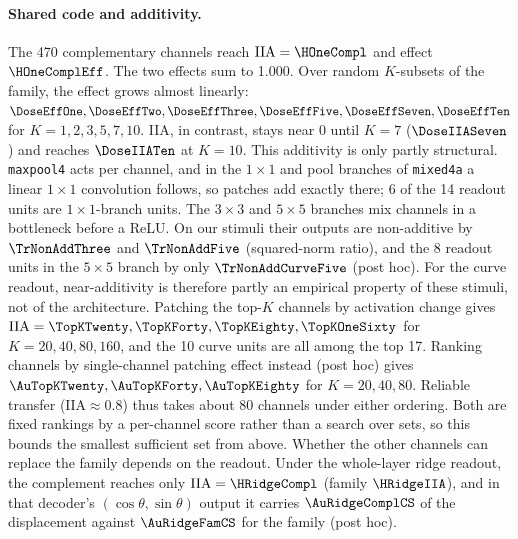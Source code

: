 \documentclass[11pt]{article}
\newcommand{\iia}{\mathrm{IIA}}
\begin{document}
\paragraph{Shared code and additivity.}
The 470 complementary channels reach $\iia=\HOneCompl$ and effect $\HOneComplEff$. The two effects sum to 1.000. Over random $K$-subsets of the family, the effect grows almost linearly: $\DoseEffOne,\DoseEffTwo,\DoseEffThree,\DoseEffFive,\DoseEffSeven,\DoseEffTen$ for $K=1,2,3,5,7,10$. IIA, in contrast, stays near 0 until $K=7$ ($\DoseIIASeven$) and reaches $\DoseIIATen$ at $K=10$. This additivity is only partly structural. \texttt{maxpool4} acts per channel, and in the $1\times1$ and pool branches of \texttt{mixed4a} a linear $1\times1$ convolution follows, so patches add exactly there; 6 of the 14 readout units are $1\times1$-branch units. The $3\times3$ and $5\times5$ branches mix channels in a bottleneck before a ReLU. On our stimuli their outputs are non-additive by $\TrNonAddThree$ and $\TrNonAddFive$ (squared-norm ratio), and the 8 readout units in the $5\times5$ branch by only $\TrNonAddCurveFive$ (post hoc). For the curve readout, near-additivity is therefore partly an empirical property of these stimuli, not of the architecture. Patching the top-$K$ channels by activation change gives $\iia=\TopKTwenty,\TopKForty,\TopKEighty,\TopKOneSixty$ for $K=20,40,80,160$, and the 10 curve units are all among the top 17. Ranking channels by single-channel patching effect instead (post hoc) gives $\AuTopKTwenty,\AuTopKForty,\AuTopKEighty$ for $K=20,40,80$. Reliable transfer ($\iia\approx0.8$) thus takes about 80 channels under either ordering. Both are fixed rankings by a per-channel score rather than a search over sets, so this bounds the smallest sufficient set from above. Whether the other channels can replace the family depends on the readout. Under the whole-layer ridge readout, the complement reaches only $\iia=\HRidgeCompl$ (family $\HRidgeIIA$), and in that decoder's $(\cos\theta,\sin\theta)$ output it carries $\AuRidgeComplCS$ of the displacement against $\AuRidgeFamCS$ for the family (post hoc).
\end{document}
